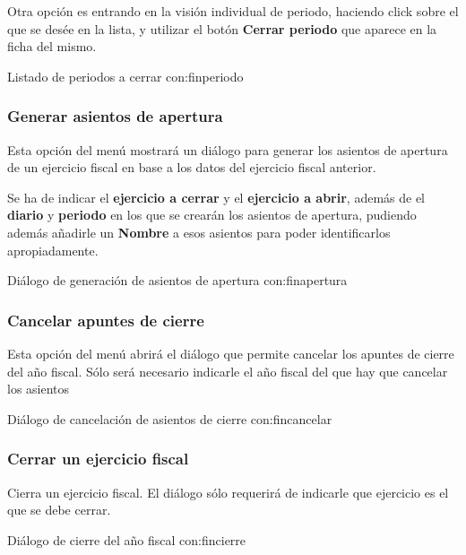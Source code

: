 Otra opción es entrando en la visión individual de periodo, haciendo click sobre el que se desée en la lista, y utilizar el botón \textbf{Cerrar periodo} que aparece en la ficha del mismo.

{Listado de periodos a cerrar}
{con:finperiodo}


\subsubsection{Generar asientos de apertura}
Esta opción del menú mostrará un diálogo para generar los asientos de apertura de un ejercicio fiscal en base a los datos del
ejercicio fiscal anterior.

Se ha de indicar el \textbf{ejercicio a cerrar} y el \textbf{ejercicio a abrir}, además de el \textbf{diario} y \textbf{periodo} en 
los que se crearán los asientos de apertura, pudiendo además añadirle un \textbf{Nombre} a esos asientos para poder 
identificarlos apropiadamente.

{Diálogo de generación de asientos de apertura}
{con:finapertura}



\subsubsection{Cancelar apuntes de cierre}

Esta opción del menú abrirá el diálogo que permite cancelar los apuntes de cierre del año fiscal. Sólo será necesario indicarle
el año fiscal del que hay que cancelar los asientos

{Diálogo de cancelación de asientos de cierre}
{con:fincancelar}



\subsubsection{Cerrar un ejercicio fiscal}

Cierra un ejercicio fiscal. El diálogo sólo requerirá de indicarle que ejercicio es el que se debe cerrar.

{Diálogo de cierre del año fiscal}
{con:fincierre}









